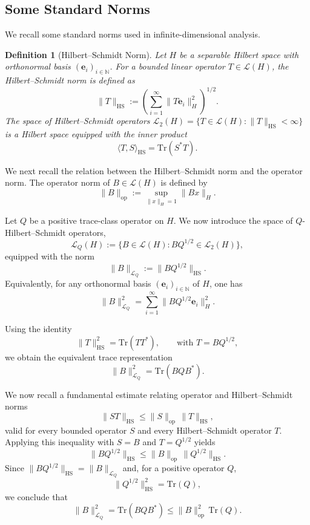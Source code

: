 \documentclass[12pt]{amsart}
\numberwithin{equation}{section}
\newtheorem{definition}[theorem]{Definition}
\begin{document}
\subsection{Some Standard Norms}\label{app:norms}
We recall some standard norms used in infinite-dimensional analysis. 

\begin{definition}[Hilbert--Schmidt Norm]\label{def:HS norm}
Let $H$ be a separable Hilbert space with orthonormal basis $(\mathbf{e}_i)_{i \in \mathbb{N}}$. For a bounded linear operator $T \in \mathscr{L}(H)$, the Hilbert--Schmidt norm is defined as
\begin{equation}
    \|T\|_{\mathrm{HS}} := \left( \sum_{i=1}^\infty \|T \mathbf{e}_i\|_H^2 \right)^{1/2}.
\end{equation}
The space of Hilbert--Schmidt operators $\mathscr{L}_2(H) = \{T \in \mathscr{L}(H) : \|T\|_{\mathrm{HS}} < \infty\}$ is a Hilbert space equipped with the inner product
\[
    \langle T, S \rangle_{\mathrm{HS}} = \mathrm{Tr}(S^* T).
\]
\end{definition}

We next recall the relation between the Hilbert--Schmidt norm and the operator norm. The operator norm of $B \in \mathscr{L}(H)$ is defined by
\[
    \|B\|_{\mathrm{op}} := \sup_{\|x\|_H=1} \|Bx\|_H.
\]

Let $Q$ be a positive trace-class operator on $H$. We now introduce the space of $Q$-Hilbert--Schmidt operators,
\[
    \mathscr{L}_Q(H) := \{B \in \mathscr{L}(H) : BQ^{1/2} \in \mathscr{L}_2(H)\},
\]
equipped with the norm
\[
    \|B\|_{\mathscr{L}_Q} := \|BQ^{1/2}\|_{\mathrm{HS}}.
\]
Equivalently, for any orthonormal basis $(\mathbf{e}_i)_{i\in\mathbb{N}}$ of $H$, one has
\[
    \|B\|_{\mathscr{L}_Q}^2 = \sum_{i=1}^\infty \|BQ^{1/2}\mathbf{e}_i\|_H^2.
\]

Using the identity
\[
    \|T\|_{\mathrm{HS}}^2 = \mathrm{Tr}(TT^*), \qquad \text{with } T = BQ^{1/2},
\]
we obtain the equivalent trace representation
\[
    \|B\|_{\mathscr{L}_Q}^2 = \mathrm{Tr}(BQB^*).
\]

We now recall a fundamental estimate relating operator and Hilbert--Schmidt norms
\[
    \|ST\|_{\mathrm{HS}} \le \|S\|_{\mathrm{op}} \, \|T\|_{\mathrm{HS}},
\]
valid for every bounded operator $S$ and every Hilbert--Schmidt operator $T$. 
Applying this inequality with $S = B$ and $T = Q^{1/2}$ yields
\[
    \|BQ^{1/2}\|_{\mathrm{HS}} \le \|B\|_{\mathrm{op}} \, \|Q^{1/2}\|_{\mathrm{HS}}.
\]
Since $\|BQ^{1/2}\|_{\mathrm{HS}} = \|B\|_{\mathscr{L}_Q}$ and, for a positive operator $Q$,
\[
    \|Q^{1/2}\|_{\mathrm{HS}}^2 = \mathrm{Tr}(Q),
\]
we conclude that
\[
    \|B\|_{\mathscr{L}_Q}^2 = \mathrm{Tr}(BQB^*) \le \|B\|_{\mathrm{op}}^2 \, \mathrm{Tr}(Q).
\]
\end{document}
